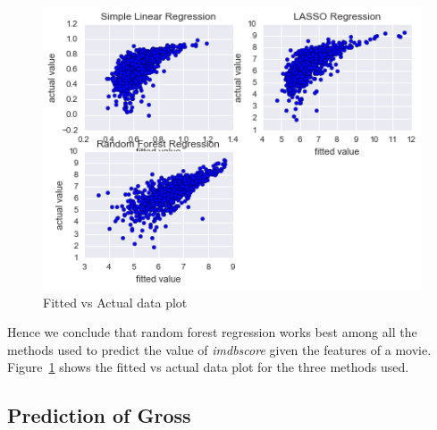 \documentclass{article}%
\begin{document}
\begin{figure}
\centering
\includegraphics[width=1.0\columnwidth]{Fig/Fitplot.png}
\caption{Fitted vs Actual data plot}
\label{fig:Fitplot}
\end{figure}

Hence we conclude that random forest regression works best among all the methods used to predict the value of \textit{imdbscore} given the features of a movie. Figure~\ref{fig:Fitplot} shows the fitted vs actual data plot for the three methods used. 

\subsection{Prediction of Gross}
\end{document}

